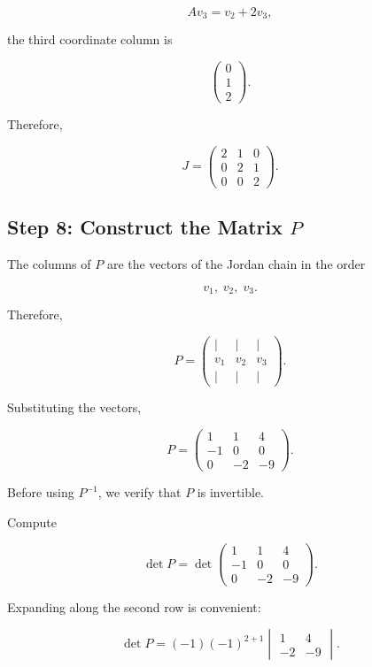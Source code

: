 \documentclass[11pt]{article}
\begin{document}
\[
Av_3=v_2+2v_3,
\]

the third coordinate column is

\[
\begin{pmatrix}
0\\
1\\
2
\end{pmatrix}.
\]

Therefore,

\[
\boxed{
J=
\begin{pmatrix}
2&1&0\\
0&2&1\\
0&0&2
\end{pmatrix}.
}
\]


\subsection{Step 8: Construct the Matrix \(P\)}

The columns of \(P\) are the vectors of the Jordan chain in the order

\[
v_1,\;v_2,\;v_3.
\]

Therefore,

\[
P=
\begin{pmatrix}
\vert&\vert&\vert\\
v_1&v_2&v_3\\
\vert&\vert&\vert
\end{pmatrix}.
\]

Substituting the vectors,

\[
\boxed{
P=
\begin{pmatrix}
1&1&4\\
-1&0&0\\
0&-2&-9
\end{pmatrix}.
}
\]

Before using \(P^{-1}\), we verify that \(P\) is invertible.

Compute

\[
\det P
=
\det
\begin{pmatrix}
1&1&4\\
-1&0&0\\
0&-2&-9
\end{pmatrix}.
\]

Expanding along the second row is convenient:

\[
\det P
=
(-1)(-1)^{2+1}
\begin{vmatrix}
1&4\\
-2&-9
\end{vmatrix}.
\]
\end{document}
